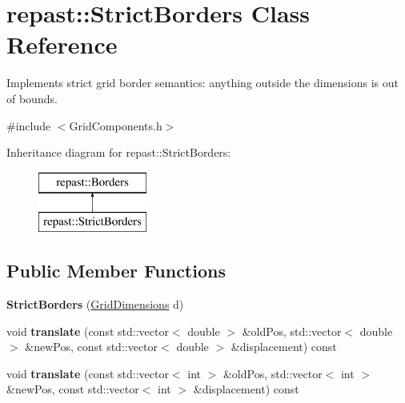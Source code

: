 \hypertarget{classrepast_1_1_strict_borders}{\section{repast\-:\-:Strict\-Borders Class Reference}
\label{classrepast_1_1_strict_borders}
}


Implements strict grid border semantics\-: anything outside the dimensions is out of bounds.  




{\ttfamily \#include $<$Grid\-Components.\-h$>$}

Inheritance diagram for repast\-:\-:Strict\-Borders\-:\begin{figure}[H]
\begin{center}
\leavevmode
\includegraphics[height=2.000000cm]{classrepast_1_1_strict_borders}
\end{center}
\end{figure}
\subsection*{Public Member Functions}
\begin{DoxyCompactItemize}
\item 
\hypertarget{classrepast_1_1_strict_borders_a5b1e9772cb35901bfac28d69a895127b}{{\bfseries Strict\-Borders} (\hyperlink{classrepast_1_1_grid_dimensions}{Grid\-Dimensions} d)}\label{classrepast_1_1_strict_borders_a5b1e9772cb35901bfac28d69a895127b}

\item 
\hypertarget{classrepast_1_1_strict_borders_a74882748db76c7cbf6ba0b633db5260b}{void {\bfseries translate} (const std\-::vector$<$ double $>$ \&old\-Pos, std\-::vector$<$ double $>$ \&new\-Pos, const std\-::vector$<$ double $>$ \&displacement) const }\label{classrepast_1_1_strict_borders_a74882748db76c7cbf6ba0b633db5260b}

\item 
\hypertarget{classrepast_1_1_strict_borders_af0bcfb876b8d4e056cfd4c221ca7354f}{void {\bfseries translate} (const std\-::vector$<$ int $>$ \&old\-Pos, std\-::vector$<$ int $>$ \&new\-Pos, const std\-::vector$<$ int $>$ \&displacement) const }\label{classrepast_1_1_strict_borders_af0bcfb876b8d4e056cfd4c221ca7354f}

\end{DoxyCompactItemize}
